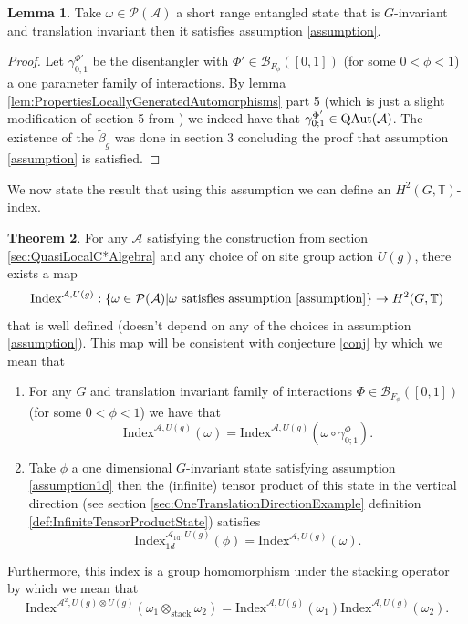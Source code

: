 \documentclass[12pt,a4paper,twoside]{article}
\let\originalleft\left
\let\originalright\right
\renewcommand{\left}{\mathopen{}\mathclose\bgroup\originalleft}
\renewcommand{\right}{\aftergroup\egroup\originalright}
\newcommand{\BB}{\mathcal B}
\newcommand{\PP}{\mathcal P}
\newcommand{\TT}{\mathbb T}
\renewcommand{\AA}{\mathcal A}
\newcommand{\QAut}[1]{\textrm{QAut}\left(#1\right)}
\theoremstyle{definition}
\newtheorem{theorem}{Theorem}[section]
\newtheorem{lemma}[theorem]{Lemma}
\numberwithin{equation}{section}
\begin{document}
\begin{lemma}\label{lem:SRE_Implies_QDisentanglable_OneTranslation}
	Take $\omega\in\PP(\AA)$ a short range entangled state that is $G$-invariant and translation invariant then it satisfies assumption \ref{assumption}.
\end{lemma}
\begin{proof}
	 Let $\gamma^{\Phi'}_{0;1}$ be the disentangler with $\Phi'\in\BB_{F_\phi}([0,1])$ (for some $0<\phi<1$) a one parameter family of interactions. By lemma \ref{lem:PropertiesLocallyGeneratedAutomorphisms} part 5 (which is just a slight modification of section 5 from \cite{ogata2021h3gmathbb}) we indeed have that $\gamma^{\Phi'}_{0;1}\in\QAut{\AA}$. The existence of the $\tilde{\beta}_g$ was done in \cite{ogata2021h3gmathbb} section 3 concluding the proof that assumption \ref{assumption} is satisfied.
\end{proof}
We now state the result that using this assumption we can define an $H^2(G,\TT)$-index.
\begin{theorem}\label{thrm:ExistenceFirstIndex}
	For any $\AA$ satisfying the construction from section \ref{sec:QuasiLocalC*Algebra} and any choice of on site group action $U(g)$, there exists a map
	\begin{equation}
		\textrm{Index}^{\AA,U(g)}:\{\omega\in\PP(\AA)|\omega\text{ satisfies assumption \ref{assumption}}\}\rightarrow H^2(G,\TT)
	\end{equation}
	that is well defined (doesn't depend on any of the choices in assumption \ref{assumption}). This map will be consistent with conjecture \ref{conj} by which we mean that
	\begin{enumerate}
		\item For any $G$ and translation invariant family of interactions $\Phi\in\BB_{F_{\phi}}([0,1])$ (for some $0<\phi<1$) we have that
		\begin{equation}
			\textrm{Index}^{\AA,U(g)}(\omega)=\textrm{Index}^{\AA,U(g)}(\omega\circ\gamma^{\Phi}_{0;1}).
		\end{equation}
		\item Take $\phi$ a one dimensional $G$-invariant state satisfying assumption \ref{assumption1d} then the (infinite) tensor product of this state in the vertical direction (see section \ref{sec:OneTranslationDirectionExample} definition \ref{def:InfiniteTensorProductState}) satisfies
		\begin{equation}
			\textrm{Index}^{\AA_{\text{1d}},U(g)}_{1d}(\phi)=\textrm{Index}^{\AA,U(g)}(\omega).
		\end{equation}
	\end{enumerate}
	Furthermore, this index is a group homomorphism under the stacking operator by which we mean that
	\begin{equation}
		\textrm{Index}^{\AA^2,U(g)\otimes U(g)}(\omega_1\otimes_{\text{stack}}\omega_2)=\textrm{Index}^{\AA,U(g)}(\omega_1)\textrm{Index}^{\AA,U(g)}(\omega_2).
	\end{equation}
\end{theorem}
\end{document}
